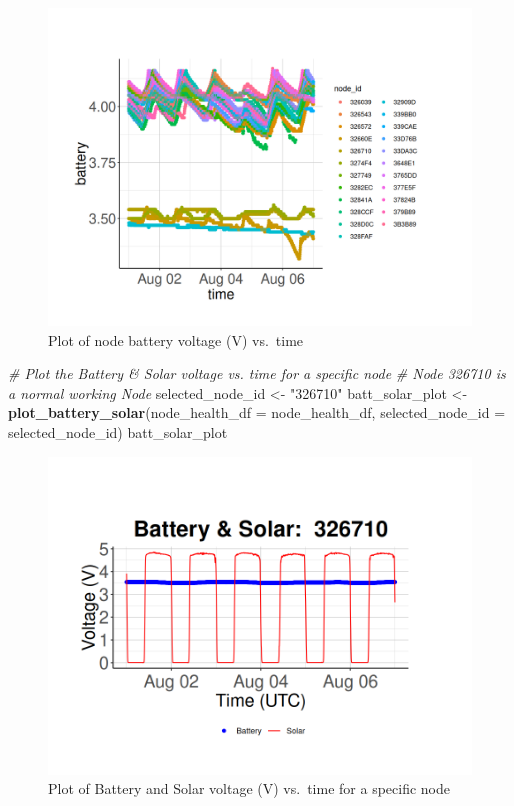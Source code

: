 \documentclass[
]{book}
\newenvironment{Shaded}{\begin{snugshade}}{\end{snugshade}}
\newcommand{\AttributeTok}[1]{\textcolor[rgb]{0.13,0.29,0.53}{#1}}
\newcommand{\CommentTok}[1]{\textcolor[rgb]{0.56,0.35,0.01}{\textit{#1}}}
\newcommand{\FunctionTok}[1]{\textcolor[rgb]{0.13,0.29,0.53}{\textbf{#1}}}
\newcommand{\NormalTok}[1]{#1}
\newcommand{\OtherTok}[1]{\textcolor[rgb]{0.56,0.35,0.01}{#1}}
\newcommand{\StringTok}[1]{\textcolor[rgb]{0.31,0.60,0.02}{#1}}
\begin{document}
\begin{figure}
\centering
\includegraphics{images/node_check_1.1.3_battery_vs_time_all_nodes.png}
\caption{Plot of node battery voltage (V) vs.~time}
\end{figure}

\begin{Shaded}
\begin{Highlighting}[]
\CommentTok{\# Plot the Battery \& Solar voltage vs. time for a specific node}
\CommentTok{\# Node 326710 is a normal working Node}
\NormalTok{selected\_node\_id }\OtherTok{\textless{}{-}} \StringTok{"326710"}
\NormalTok{batt\_solar\_plot }\OtherTok{\textless{}{-}} \FunctionTok{plot\_battery\_solar}\NormalTok{(}\AttributeTok{node\_health\_df =}\NormalTok{ node\_health\_df, }
                                      \AttributeTok{selected\_node\_id =}\NormalTok{ selected\_node\_id)}
\NormalTok{batt\_solar\_plot }
\end{Highlighting}
\end{Shaded}

\begin{figure}
\centering
\includegraphics{images/node_check_1.1.3_node_specific_battery_solar_normal.png}
\caption{Plot of Battery and Solar voltage (V) vs.~time for a specific node}
\end{figure}
\end{document}
